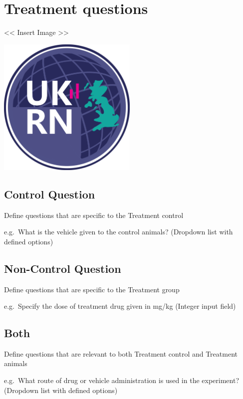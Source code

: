 \documentclass[]{book}
\begin{document}
\section{Treatment questions}\label{treatment-questions}

\textless{}\textless{} Insert Image \textgreater{}\textgreater{}

\includegraphics[width=0.50000\textwidth,height=0.50000\textwidth]{figs/evidence-triangle.png}

\subsection{Control Question}\label{control-question-1}

Define questions that are specific to the Treatment control

e.g.~What is the vehicle given to the control animals? (Dropdown list
with defined options)

\subsection{Non-Control Question}\label{non-control-question-1}

Define questions that are specific to the Treatment group

e.g.~Specify the dose of treatment drug given in mg/kg (Integer input
field)

\subsection{Both}\label{both-1}

Define questions that are relevant to both Treatment control and
Treatment animals

e.g.~What route of drug or vehicle administration is used in the
experiment? (Dropdown list with defined options)
\end{document}
